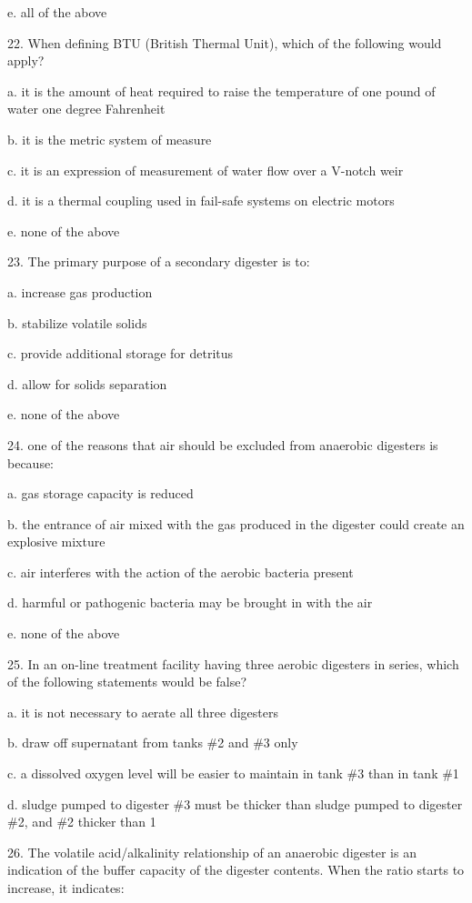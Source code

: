 \documentclass{article}
\begin{document}
e. all of the above 


22. When defining BTU (British Thermal Unit), which of the following would apply? 

a. it is the amount of heat required to raise the temperature of one pound of water one degree Fahrenheit 

b. it is the metric system of measure 

c. it is an expression of measurement of water flow over a V-notch weir 

d. it is a thermal coupling used in fail-safe systems on electric motors 

e. none of the above 


23. The primary purpose of a secondary digester is to: 

a. increase gas production 

b. stabilize volatile solids 

c. provide additional storage for detritus 

d. allow for solids separation 

e. none of the above 


24. one of the reasons that air should be excluded from anaerobic digesters is because: 

a. gas storage capacity is reduced 

b. the entrance of air mixed with the gas produced in the digester could create an explosive mixture 

c. air interferes with the action of the aerobic bacteria present 

d. harmful or pathogenic bacteria may be brought in with the air 

e. none of the above 


25. In an on-line treatment facility having three aerobic digesters in series, which of the following statements would be false? 

a. it is not necessary to aerate all three digesters 

b. draw off supernatant from tanks \#2 and \#3 only 

c. a dissolved oxygen level will be easier to maintain in tank \#3 than in tank \#1 

d. sludge pumped to digester \#3 must be thicker than sludge pumped to digester \#2, and \#2 thicker than 1 


26. The volatile acid/alkalinity relationship of an anaerobic digester is an indication of the buffer capacity of the digester contents. When the ratio starts to increase, it indicates: 
\end{document}
